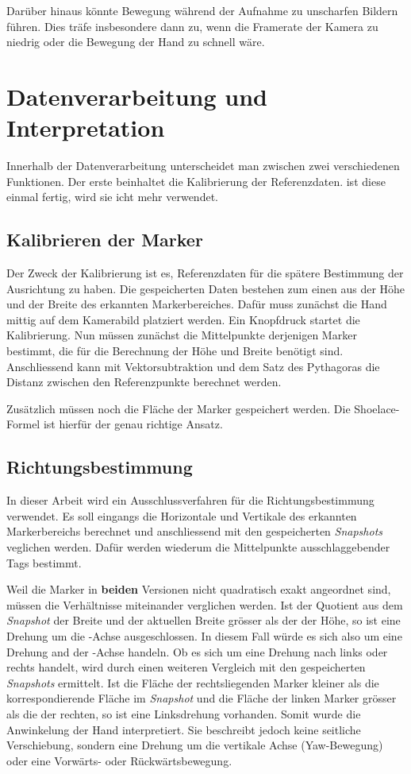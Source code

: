 Darüber hinaus könnte Bewegung während der Aufnahme zu unscharfen Bildern führen.
Dies träfe insbesondere dann zu, wenn die Framerate der Kamera zu niedrig oder die Bewegung der Hand zu schnell wäre.

\section{Datenverarbeitung und Interpretation}
Innerhalb der Datenverarbeitung unterscheidet man zwischen zwei verschiedenen Funktionen.
Der erste beinhaltet die Kalibrierung der Referenzdaten.
ist diese einmal fertig, wird sie icht mehr verwendet.

\subsection{Kalibrieren der Marker}
Der Zweck der Kalibrierung ist es, Referenzdaten für die spätere Bestimmung der Ausrichtung zu haben.\footnotemark{}
Die gespeicherten Daten bestehen zum einen aus der Höhe und der Breite des erkannten Markerbereiches.
Dafür muss zunächst die Hand mittig auf dem Kamerabild platziert werden.
Ein Knopfdruck startet die Kalibrierung. 
Nun müssen zunächst die Mittelpunkte derjenigen Marker bestimmt, die für die Berechnung der Höhe und Breite benötigt sind.
Anschliessend kann mit Vektorsubtraktion und dem Satz des Pythagoras die Distanz zwischen den Referenzpunkte berechnet werden.

Zusätzlich müssen noch die Fläche der Marker gespeichert werden.
Die Shoelace-Formel ist hierfür der genau richtige Ansatz.

\subsection{Richtungsbestimmung}
In dieser Arbeit wird ein Ausschlussverfahren für die Richtungsbestimmung verwendet.
Es soll eingangs die Horizontale und Vertikale des erkannten Markerbereichs berechnet und anschliessend mit den gespeicherten \textit{Snapshots} veglichen werden.
Dafür werden wiederum die Mittelpunkte ausschlaggebender Tags bestimmt.

Weil die Marker in \textbf{beiden} Versionen nicht quadratisch exakt angeordnet sind, müssen die Verhältnisse miteinander verglichen werden.
Ist der Quotient aus dem \textit{Snapshot} der Breite und der aktuellen Breite grösser als der der Höhe, so ist eine Drehung um die -Achse ausgeschlossen.
In diesem Fall würde es sich also um eine Drehung and der -Achse handeln.
Ob es sich um eine Drehung nach links oder rechts handelt, wird durch einen weiteren Vergleich mit den gespeicherten \textit{Snapshots} ermittelt.
Ist die Fläche der rechtsliegenden Marker kleiner als die korrespondierende Fläche im \textit{Snapshot} und die Fläche der linken Marker grösser als die der rechten, so ist eine Linksdrehung vorhanden.
Somit wurde die Anwinkelung der Hand interpretiert.
Sie beschreibt jedoch keine seitliche Verschiebung, sondern eine Drehung um die vertikale Achse (Yaw-Bewegung) oder eine Vorwärts- oder Rückwärtsbewegung.

